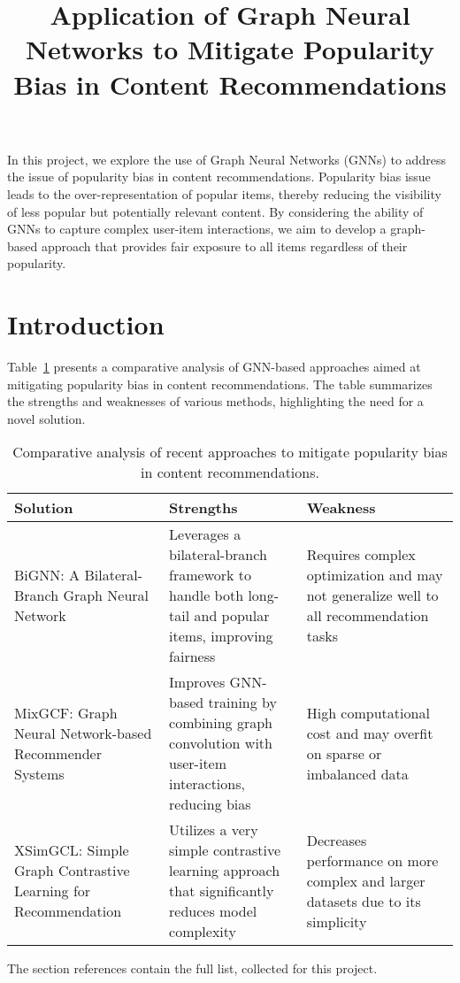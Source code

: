 \documentclass[12pt]{article}
\title{Application of Graph Neural Networks to Mitigate Popularity Bias in Content Recommendations}
\date{}
\begin{document}
\maketitle
In this project, we explore the use of Graph Neural Networks (GNNs) to address the issue of popularity bias in content recommendations.
Popularity bias issue leads to the over-representation of popular items, thereby reducing the visibility of less popular but potentially relevant
content. By considering the ability of GNNs to capture complex user-item interactions, we aim to develop a graph-based approach that provides
fair exposure to all items regardless of their popularity. 

\section{Introduction}
Table~\ref{tab:intro_comparative} presents a comparative analysis of GNN-based approaches aimed at mitigating popularity bias in content recommendations.
The table summarizes the strengths and weaknesses of various methods, highlighting the need for a novel solution.

\begin{table}[!htbp]
\label{tab:intro_comparative}
\caption{Comparative analysis of recent approaches to mitigate popularity bias in content recommendations.}
\begin{tabular}{p{5cm}|p{5cm}|p{5cm}}
	Solution & Strengths & Weakness \\
	\hline
	BiGNN: A Bilateral-Branch Graph Neural Network~\cite{Kou2022} & 
	Leverages a bilateral-branch framework to handle both long-tail and popular items, improving fairness & 
	Requires complex optimization and may not generalize well to all recommendation tasks \\
	\hline
	MixGCF: Graph Neural Network-based Recommender Systems~\cite{Huang2021} & 
	Improves GNN-based training by combining graph convolution with user-item interactions, reducing bias & 
	High computational cost and may overfit on sparse or imbalanced data \\
	\hline
	XSimGCL: Simple Graph Contrastive Learning for Recommendation~\cite{Yu2023} & 
	Utilizes a very simple contrastive learning approach that significantly reduces model complexity & 
	Decreases performance on more complex and larger datasets due to its simplicity \\
\end{tabular}
\end{table}
 
 The section references contain the full list, collected for this project. 
\nocite{*} %



\end{document}
